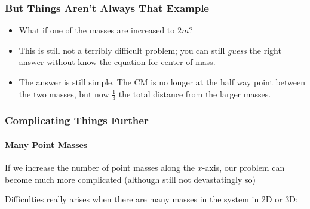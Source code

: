 \documentclass[12pt,compress,aspectratio=169]{beamer}
\begin{document}
 
\begin{frame}
  \frametitle{But Things Aren't Always That Example}
  \begin{itemize}
  \item What if one of the masses are increased to $2m$?
  \item This is still not a terribly difficult problem; you can still
    \emph{guess} the right answer without know the equation for center of mass.
    
    \vspace{.25in}
    \begin{center}
    \end{center}
    \vspace{.15in}

  \item<2-> The answer is still simple. The CM is no longer at the half way
    point between the two masses, but now $\frac{1}{3}$ the total distance from
    the larger masses.
  \end{itemize}
\end{frame}


\begin{frame}
  \frametitle{Complicating Things Further}
  \framesubtitle{Many Point Masses}
  If we increase the number of point masses along the $x$-axis, our problem can
  become much more complicated (although still not devastatingly so)

  \vspace{.1in}
  \begin{center}
  \end{center}
  
  Difficulties really arises when there are many masses in the system in 2D or
  3D:
    
  \vspace{-.1in}
  \begin{center}
  \end{center}
\end{frame}
\end{document}
